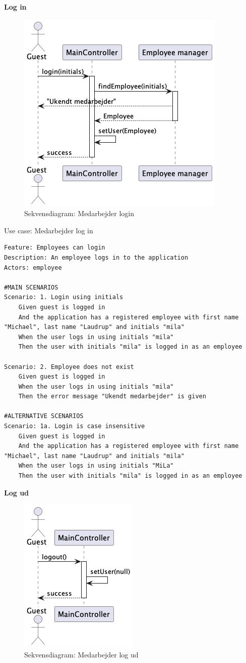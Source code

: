\textbf{Log in}
\begin{figure}[H]
    \centering
    \caption{Sekvensdiagram: Medarbejder login}\label{fig:sequence_login}
    \includegraphics[width = .45\textwidth]{Diagrams/seq_login.png}
\end{figure}
\begin{listing}[H]
    \centering
    \caption{Use case: Medarbejder log in}\label{lst:usecase_login}
    \begin{verbatim}  
Feature: Employees can login
Description: An employee logs in to the application
Actors: employee

#MAIN SCENARIOS
Scenario: 1. Login using initials
    Given guest is logged in
    And the application has a registered employee with first name "Michael", last name "Laudrup" and initials "mila"
    When the user logs in using initials "mila" 
    Then the user with initials "mila" is logged in as an employee

Scenario: 2. Employee does not exist
    Given guest is logged in
    When the user logs in using initials "mila" 
    Then the error message "Ukendt medarbejder" is given

#ALTERNATIVE SCENARIOS
Scenario: 1a. Login is case insensitive
    Given guest is logged in
    And the application has a registered employee with first name "Michael", last name "Laudrup" and initials "mila"
    When the user logs in using initials "MiLa" 
    Then the user with initials "mila" is logged in as an employee
    \end{verbatim}
\end{listing}
\textbf{Log ud}
\begin{figure}[H]
    \centering
    \caption{Sekvensdiagram: Medarbejder log ud}\label{fig:sequence_logout}
    \includegraphics[width = .25\textwidth]{Diagrams/seq_logout.png}
\end{figure}
